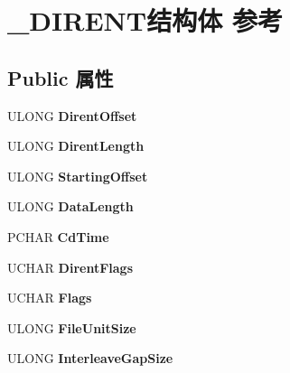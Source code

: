 \hypertarget{struct___d_i_r_e_n_t}{}\section{\+\_\+\+D\+I\+R\+E\+N\+T结构体 参考}
\label{struct___d_i_r_e_n_t}
\subsection*{Public 属性}
\begin{DoxyCompactItemize}
\item 
\mbox{\label{struct___d_i_r_e_n_t_a8bdbe923c10c156823498c075904aae3}} 
U\+L\+O\+NG {\bfseries Dirent\+Offset}
\item 
\mbox{\label{struct___d_i_r_e_n_t_a8348eee57dd77cde015b09c7747c5686}} 
U\+L\+O\+NG {\bfseries Dirent\+Length}
\item 
\mbox{\label{struct___d_i_r_e_n_t_a0a02bbf2cf63c1794e7a0267984382ff}} 
U\+L\+O\+NG {\bfseries Starting\+Offset}
\item 
\mbox{\label{struct___d_i_r_e_n_t_a4d0809379ad47b5723fbd1f4a1376aaa}} 
U\+L\+O\+NG {\bfseries Data\+Length}
\item 
\mbox{\label{struct___d_i_r_e_n_t_a3a09e0d571e94411081f9b01a4e5966d}} 
P\+C\+H\+AR {\bfseries Cd\+Time}
\item 
\mbox{\label{struct___d_i_r_e_n_t_a02b7f355398ba22bdf6db87be877949b}} 
U\+C\+H\+AR {\bfseries Dirent\+Flags}
\item 
\mbox{\label{struct___d_i_r_e_n_t_a7c3f13a3cd61e9c7a2ccdb83b5f64314}} 
U\+C\+H\+AR {\bfseries Flags}
\item 
\mbox{\label{struct___d_i_r_e_n_t_a4b0bafa3f558ff9c737354d63cbc8214}} 
U\+L\+O\+NG {\bfseries File\+Unit\+Size}
\item 
\mbox{\label{struct___d_i_r_e_n_t_a1754e773418890697e7c4ee1d7c33150}} 
U\+L\+O\+NG {\bfseries Interleave\+Gap\+Size}
\item 

\end{DoxyCompactItemize}
